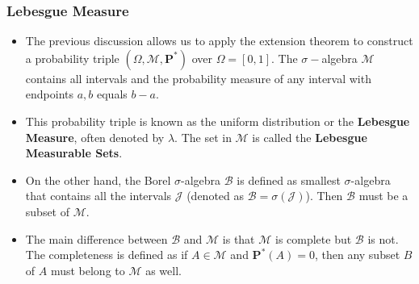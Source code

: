 \documentclass[handout]{beamer}
\newcommand{\BP}{\mathbf{P}}
\begin{document}
\frame
{
  \frametitle{Lebesgue Measure}

   \begin{itemize}



\item<1-> The previous discussion allows us to apply the extension theorem to construct a probability triple $(\Omega, \mathcal{M}, \BP^*)$ over $\Omega=[0,1]$. The $\sigma-$algebra $\mathcal{M}$ contains all intervals and the probability measure of any interval with endpoints $a,b$ equals $b-a$.

\item<2-> This probability triple is known as the uniform distribution or the \textbf{Lebesgue Measure}, often denoted by $\lambda$. The set in $\mathcal{M}$ is called the \textbf{Lebesgue Measurable Sets}. 

\item<3-> On the other hand, the Borel $\sigma$-algebra $\mathcal{B}$ is defined as smallest $\sigma$-algebra that contains all the intervals $\mathcal{J}$ (denoted as $\mathcal{B}=\sigma(\mathcal{J})$). Then  $\mathcal{B}$ must be a subset of $\mathcal{M}$.


\item<3-> The main difference between $\mathcal{B}$ and $\mathcal{M}$ is that $\mathcal{M}$ is complete but $\mathcal{B}$ is not. The completeness is defined as if 
$A\in \mathcal{M}$ and $\BP^*(A)=0$, then any subset $B$ of $A$ must belong to $\mathcal{M}$ as well.
                   \end{itemize}
}
\end{document}
